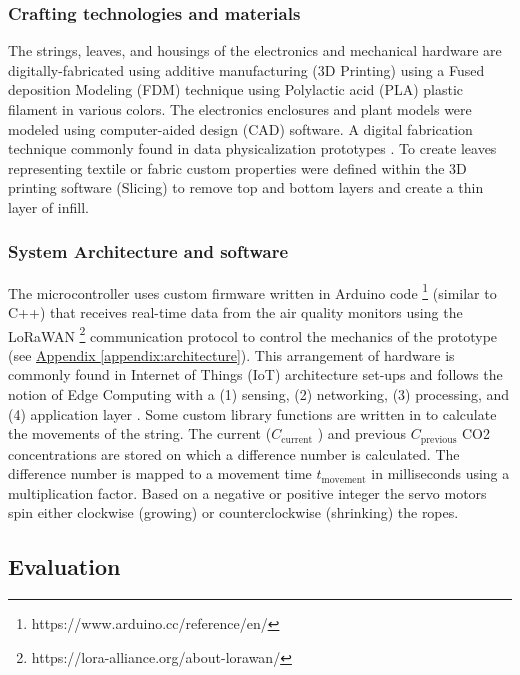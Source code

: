 \subsubsection{Crafting technologies and materials}
The strings, leaves, and housings of the electronics and mechanical hardware are digitally-fabricated using additive manufacturing (3D Printing) using a Fused deposition Modeling (FDM) technique using Polylactic acid (PLA) plastic filament in various colors. The electronics enclosures and plant models were modeled using computer-aided design (CAD) software. A digital fabrication technique commonly found in data physicalization prototypes \cite{anhalt_university_germany_design_2022}. To create leaves representing textile or fabric custom properties were defined within the 3D printing software (Slicing) to remove top and bottom layers and create a thin layer of infill.

\subsubsection{System Architecture and software}

The microcontroller uses custom firmware written in Arduino code \footnote{https://www.arduino.cc/reference/en/} (similar to C++) that receives real-time data from the air quality monitors using the LoRaWAN \footnote{https://lora-alliance.org/about-lorawan/} communication protocol to control the mechanics of the prototype (see \hyperref[appendix:architecture]{Appendix \ref*{appendix:architecture}}). This arrangement of hardware is commonly found in Internet of Things (IoT) architecture set-ups and follows the notion of Edge Computing with a (1) sensing, (2) networking, (3) processing, and (4) application layer \cite{li_edge-oriented_2019, idrees_edge_2018}. Some custom library functions are written in to calculate the movements of the string. The current (\( C_{\text{current}} \) ) and previous \( C_{\text{previous}} \) CO2 concentrations are stored on which a difference number is calculated. The difference number is mapped to a movement time \( t_{\text{movement}} \) in milliseconds using a multiplication factor. Based on a negative or positive integer the servo motors spin either clockwise (growing) or counterclockwise (shrinking) the ropes.


\subsection{Evaluation}
\label{sec:evaluation_results}

